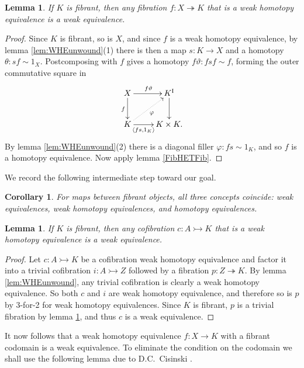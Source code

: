 \documentclass[11pt]{amsart}
\newcommand{\mono}{\ensuremath{\rightarrowtail}}
\newcommand{\ra}{\ensuremath{\rightarrow}}
\renewcommand{\to}{\ensuremath{\rightarrow}}
\newcommand{\onto}{\ensuremath{\twoheadrightarrow}}
\newcommand{\I}{\ensuremath{\mathrm{I}}}
\newtheorem{lemma}[theorem]{Lemma}
\newtheorem{corollary}[theorem]{Corollary}
\theoremstyle{remark}
\theoremstyle{definition}
\begin{document}
\begin{lemma}\label{FibWHEfibCodTFib}
If $K$ is fibrant, then any fibration $f : X \onto K$ that is a weak homotopy equivalence is a weak equivalence.
\end{lemma}
\begin{proof}
Since $K$ is fibrant, so is $X$, and since $f$ is a weak homotopy equivalence, by lemma \ref{lem:WHEunwound}(1) there is then a map $s : K\ra X$ and a homotopy $\theta: sf \sim 1_X$.  Postcomposing with $f$ gives a homotopy $f\vartheta: fsf \sim f$, forming the outer commutative square in
\[
\xymatrix{
X \ar[d]_{f} \ar[r]^{f\vartheta}  & K^\I \ar[d] \\
K \ar@{..>}[ru]_{\varphi} \ar[r]_-{\langle fs, 1_K\rangle} & K\times K.
}
\]
By lemma \ref{lem:WHEunwound}(2) there is a diagonal filler $\varphi : fs\sim 1_K$, and so $f$ is a homotopy equivalence. Now apply lemma \ref{FibHETFib}.
\end{proof}

We record the following intermediate step toward our goal.

\begin{corollary} For maps  between fibrant objects, all three concepts coincide: weak equivalences, weak homotopy equivalences, and homotopy equivalences.
\end{corollary}

\begin{lemma}\label{CofWHEfibCodTCof}
If $K$ is fibrant, then any cofibration $c : A \mono K$ that is a weak homotopy equivalence is a weak equivalence.
\end{lemma}
\begin{proof}
Let $c : A \mono K$ be a cofibration weak homotopy equivalence and factor it into a trivial cofibration $i : A\mono Z$ followed by a fibration $p: Z\onto K$.  By lemma \ref{lem:WHEunwound}, any trivial cofibration is clearly a weak homotopy equivalence.  So both 
$c$ and $i$ are weak homotopy equivalence, and therefore so is $p$ by 3-for-2 for weak homotopy equivalences.   Since $K$ is fibrant, $p$ is a trivial fibration by lemma \ref{FibWHEfibCodTFib}, and thus $c$ is a weak equivalence.  
\end{proof}

It now follows that a weak homotopy equivalence $f : X \to K$ with a fibrant codomain is a weak equivalence. To eliminate the condition on the codomain we shall use the following lemma due to D.C.~Cisinski \cite{cisinski-asterisque}.
\end{document}
